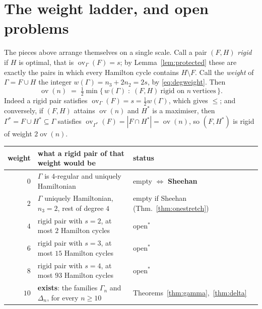 \documentclass[11pt,a4paper]{article}
\theoremstyle{definition}
\theoremstyle{remark}
\newcommand{\ov}{\operatorname{ov}}
\begin{document}
\section{The weight ladder, and open problems}\label{sec:open}

The pieces above arrange themselves on a single scale. Call a pair $(F,H)$ \emph{rigid} if $H$ is optimal, that is $\ov_\Gamma(F)=s$; by Lemma~\ref{lem:protected} these are exactly the pairs in which every Hamilton cycle contains $H\setminus F$. Call the \emph{weight} of $\Gamma=F\cup H$ the integer $w(\Gamma)=n_3+2n_2=2s$, by \eqref{eq:degweight}. Then
\[
\ov(n)\;=\;\tfrac12\min\{\,w(\Gamma)\;:\;(F,H)\ \text{rigid on }n\ \text{vertices}\,\}.
\]
Indeed a rigid pair satisfies $\ov_\Gamma(F)=s=\tfrac12w(\Gamma)$, which gives $\le$; and conversely, if $(F,H)$ attains $\ov(n)$ and $H^*$ is a maximiser, then $\Gamma^*=F\cup H^*\subseteq\Gamma$ satisfies $\ov_{\Gamma^*}(F)=|F\cap H^*|=\ov(n)$, so $(F,H^*)$ is rigid of weight $2\ov(n)$.

\begin{center}
\begin{tabular}{rll}
\toprule
weight & what a rigid pair of that weight would be & status\\
\midrule
$0$ & $\Gamma$ is $4$-regular and uniquely Hamiltonian & empty $\iff$ \textbf{Sheehan}\\
$2$ & $\Gamma$ uniquely Hamiltonian, $n_3=2$, rest of degree $4$ & empty if Sheehan (Thm.~\ref{thm:onestretch})\\
$4$ & rigid pair with $s=2$, at most $2$ Hamilton cycles & open$^{*}$\\
$6$ & rigid pair with $s=3$, at most $15$ Hamilton cycles & open$^{*}$\\
$8$ & rigid pair with $s=4$, at most $93$ Hamilton cycles & open$^{*}$\\
$10$ & \textbf{exists}: the families $\Gamma_n$ and $\Delta_n$, for every $n\ge10$ & Theorems~\ref{thm:gamma},~\ref{thm:delta}\\
\bottomrule
\end{tabular}
\end{center}
\end{document}
